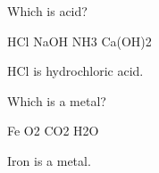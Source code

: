 \question Which is acid?

\begin{choices}
\CorrectChoice HCl
\choice NaOH
\choice NH3
\choice Ca(OH)2
\end{choices}

\begin{solution}
HCl is hydrochloric acid.
\end{solution}

\question Which is a metal?

\begin{choices}
\CorrectChoice Fe
\choice O2
\choice CO2
\choice H2O
\end{choices}

\begin{solution}
Iron is a metal.
\end{solution}
